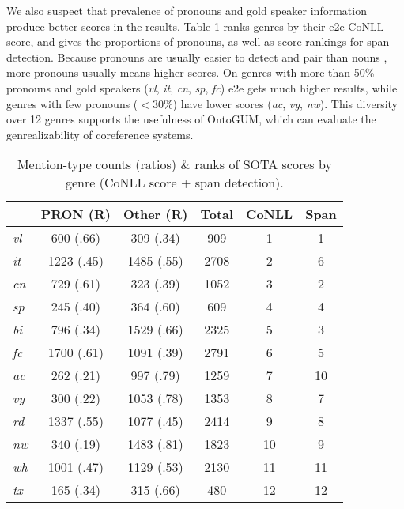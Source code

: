 \documentclass[11pt,a4paper]{article}
\begin{document}
We also suspect that prevalence of pronouns and gold speaker information produce better scores in the results. Table \ref{tab:mention_pair} ranks genres by their e2e CoNLL score, and gives the proportions of pronouns, as well as score rankings for span detection. Because pronouns are usually easier to detect and pair than nouns \citep{durrett-klein-2013-easy}, more pronouns usually means higher scores. On genres with more than 50\% pronouns and gold speakers (\textit{vl}, \textit{it}, \textit{cn}, \textit{sp}, \textit{fc}) e2e gets much higher results, while genres with few pronouns ($<$30\%) have lower scores (\textit{ac}, \textit{vy}, \textit{nw}). This diversity over 12 genres supports the usefulness of OntoGUM, which can evaluate the genrealizability of coreference systems.

\begin{table}[h!tb]
    \centering\small
    \begin{tabular}{l|c|c|c|c|c}
& PRON (R) & Other (R) & Total & CoNLL & Span \\\hline
        \textit{vl} & 600 (.66) & 309 (.34) & 909 & 1 & 1\\
        \textit{it} & 1223 (.45) & 1485 (.55) & 2708 & 2 & 6\\
        \textit{cn} & 729 (.61) & 323 (.39) & 1052 & 3 & 2\\
        \textit{sp} & 245 (.40) & 364 (.60) & 609 & 4 & 4\\
        \textit{bi} & 796 (.34) & 1529 (.66) & 2325 & 5 & 3\\
        \textit{fc} & 1700 (.61) & 1091 (.39) & 2791 & 6 & 5\\
        \textit{ac} & 262 (.21) & 997 (.79) & 1259 & 7 & 10\\
        \textit{vy} & 300 (.22) & 1053 (.78) & 1353 & 8 & 7\\
        \textit{rd} & 1337 (.55) & 1077 (.45) & 2414 & 9 & 8\\
        \textit{nw} & 340 (.19) & 1483 (.81) & 1823 & 10 & 9\\
        \textit{wh} & 1001 (.47) & 1129 (.53) & 2130 & 11 & 11\\
        \textit{tx} & 165 (.34) & 315 (.66) & 480 & 12 & 12\\
        \hline
    \end{tabular}
    \caption{Mention-type counts (ratios) \& ranks of SOTA scores by genre (CoNLL score + span detection).}
    \label{tab:mention_pair}
\end{table}
\end{document}
